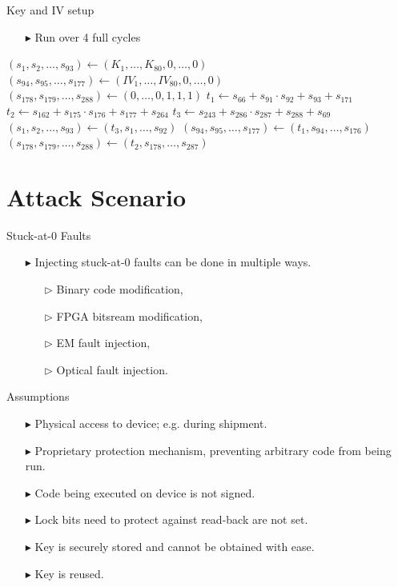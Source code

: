 \documentclass[conference]{IEEEtran}
\begin{document}
Key and IV setup
\begin{itemize}
\item[$\blacktriangleright$] Run over 4 full cycles
\end{itemize}
\begin{algorithm}[H]
\begin{algorithmic}[1]
\State $(s_1,s_2,\dots,s_{93}) \gets (K_1,\dots,K_{80},0,\dots,0)$
\State $(s_{94},s_{95},\dots,s_{177}) \gets (IV_1,\dots,IV_{80},0,\dots,0)$
\State $(s_{178},s_{179},\dots,s_{288}) \gets (0,\dots,0,1,1,1)$
\State
{}
\State $t_1 \gets s_{66} + s_{91} \cdot s_{92} + s_{93} + s_{171}$
\State $t_2 \gets s_{162} + s_{175} \cdot s_{176} + s_{177} + s_{264}$
\State $t_3 \gets s_{243} + s_{286} \cdot s_{287} + s_{288}+ s_{69}$
\State
\State $(s_1,s_2,\dots,s_{93}) \gets (t_3,s_1,\dots,s_{92})$
\State $(s_{94},s_{95},\dots,s_{177}) \gets (t_1,s_{94},\dots,s_{176})$
\State $(s_{178},s_{179},\dots,s_{288}) \gets (t_2,s_{178},\dots,s_{287})$
\EndFor
\end{algorithmic}
\end{algorithm}


\section{Attack Scenario}

Stuck-at-0 Faults
\begin{itemize}
\item[$\blacktriangleright$] Injecting stuck-at-0 faults can be done in multiple ways.
\begin{itemize}
\item[$\triangleright$] Binary code modification,
\item[$\triangleright$] FPGA bitsream modification,
\item[$\triangleright$] EM fault injection, 
\item[$\triangleright$] Optical fault injection. 
\end{itemize}
\end{itemize}


Assumptions
\begin{itemize}
\item[$\blacktriangleright$] Physical access to device; e.g. during shipment.
\item[$\blacktriangleright$] Proprietary protection mechanism, preventing arbitrary code from being run.
\item[$\blacktriangleright$] Code being executed on device is not signed.
\item[$\blacktriangleright$] Lock bits need to protect against read-back are not set.
\item[$\blacktriangleright$] Key is securely stored and cannot be obtained with ease.
\item[$\blacktriangleright$] Key is reused.
\end{itemize}
\end{document}
